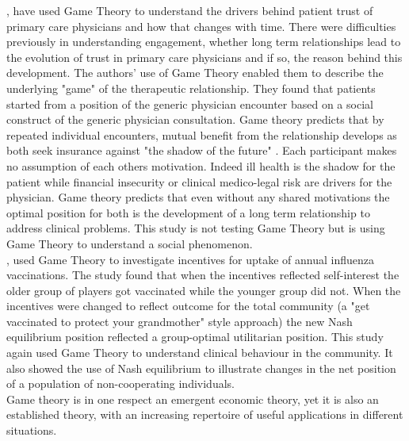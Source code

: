 \documentclass[11pt,a4paper]{article}
\begin{document}
\citet{tarrant2010continuity}, have used Game Theory to understand the drivers behind patient trust of primary care physicians and how that changes with time. There were difficulties previously in understanding engagement, whether long term relationships lead to the evolution of trust in primary care physicians and if so, the reason behind this development. The authors' use of Game Theory enabled them to describe the underlying "game" of the therapeutic relationship. They found that patients started from a position of the generic physician encounter based on a social construct of the generic physician consultation. Game theory predicts that by repeated individual encounters, mutual benefit from the relationship develops as both seek insurance against "the shadow of the future" \citep{tarrant2010continuity}. Each participant makes no assumption of each others motivation. Indeed ill health is the shadow for the patient while financial insecurity or clinical medico-legal risk  are drivers for the physician. Game theory predicts that even without any shared motivations the optimal position for both is the development of a long term relationship to address clinical problems.  This study is not testing Game Theory but is using Game Theory to understand a social phenomenon. \\

\citet{chapman2012using}, used Game Theory to investigate incentives for uptake of annual influenza vaccinations.  The study found that when the incentives reflected self-interest the older group of players got vaccinated while the younger group did not. When the incentives were changed to reflect outcome for the total community (a "get vaccinated to protect your grandmother" style approach) the new Nash equilibrium position reflected a group-optimal utilitarian position. This study again used Game Theory to understand clinical behaviour in the community. It also showed the use of Nash equilibrium to illustrate changes in the net position of a population of non-cooperating individuals. \\

Game theory is in one respect an emergent economic theory, yet it is also an established theory, with an increasing repertoire of useful applications in different situations. \\
\end{document}
